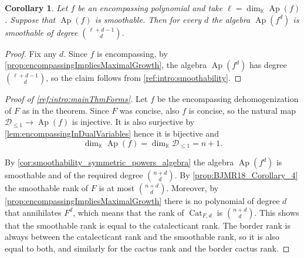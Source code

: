 \documentclass[a4paper,11pt,reqno]{amsart}
\newcommand{\calD}{\mathcal{D}}
\newcommand{\bbK}{\mathbb{K}}
\DeclareMathOperator{\Ap}{Ap}
\DeclareMathOperator{\brk}{brk}
\DeclareMathOperator{\Cat}{Cat}
\numberwithin{equation}{section}
\theoremstyle{definition}
\theoremstyle{plain}
\newtheorem{cor}[defn]{Corollary}
\theoremstyle{remark}
\newtheorem{exam}[defn]{Example}
\begin{document}
\begin{cor}\label{cor:smoothability_symmetric_powers_algebra}
    Let $f$ be an encompassing polynomial and take $\ell = \dim_{\bbK} \Ap(f)$.
    Suppose that $\Ap(f)$ is smoothable. Then
    for every $d$ the algebra $\Ap(f^d)$ is smoothable of
    degree $\binom{\ell+d-1}{d}$.
\end{cor}
\begin{proof}
    Fix any $d$.  Since $f$ is encompassing, by
    \autoref{prop:encompassingImpliesMaximalGrowth}, the algebra $\Ap(f^d)$ has degree
    $\binom{\ell+d-1}{d}$, so the claim follows from
    \autoref{ref:intro:smoothability}.
\end{proof}

\begin{proof}[Proof of \autoref{ref:intro:mainThmForms}]
    Let $f$ be the encompassing dehomogenization of $F$ as in the theorem.
    Since $F$ was concise, also $f$ is concise, so the natural map
    $\calD_{\leq 1}\to \Ap(f)$ is injective. It is also surjective by
    \autoref{lem:encompassingInDualVariables} hence it is bijective and
    \[
    \dim_{\bbK}
    \Ap(f) = \dim_{\bbK} \calD_{\leq 1} = n+1.
    \]

    By
    \autoref{cor:smoothability_symmetric_powers_algebra} the algebra
    $\Ap(f^d)$ is smoothable and of {the required} degree $\binom{n+d}{d}$. By
    \autoref{prop:BJMR18_Corollary_4} the smoothable rank of $F$ is at most
    $\binom{n+d}{d}$. Moreover, by
    \autoref{prop:encompassingImpliesMaximalGrowth} there is no polynomial of
    degree $d$ {that annihilates} $F^d$, which means that the rank of
    $\Cat_{F, d}$ is $\binom{n+d}{d}$. This shows that the smoothable rank
    {is equal to the catalecticant rank}. The border rank is always between the
    {catalecticant rank and the smoothable rank}, {so it is also equal to both,} and similarly for {the cactus rank and the border cactus rank.}
\end{proof}

\end{document}
